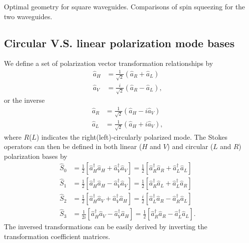 \documentclass[aps,pra,twocolumn,superscriptaddress]{revtex4-1} %
\newcommand{\comment}[1]{{\color{Maroon} #1}}
\begin{document}
\comment{Optimal geometry for square waveguides. Comparisons of spin squeezing for the two waveguides.}



\begin{appendix}
\section{Circular V.S. linear polarization mode bases}\label{Appendix:LRbases}
We define a set of polarization vector transformation relationships by 
\begin{subequations}
\begin{align}
\hat{a}_H &= \frac{1}{\sqrt{2}}(\hat{a}_R+\hat{a}_L )\\
\hat{a}_V &= \frac{i}{\sqrt{2}}(\hat{a}_R-\hat{a}_L ),
\end{align}
\end{subequations}
or the inverse
\begin{subequations}
\begin{align}
\hat{a}_R &= \frac{1}{\sqrt{2}}(\hat{a}_H-i\hat{a}_V )\\
\hat{a}_L &= \frac{1}{\sqrt{2}}(\hat{a}_H+i\hat{a}_V ),
\end{align}
\end{subequations}
where $ R $($ L $) indicates the right(left)-circularly polarized mode.
The Stokes operators can then be defined in both linear ($ H $ and $ V $) and circular ($ L $ and $ R $) polarization bases by
\begin{subequations}
\begin{align}
\hat{S}_0 &= \frac{1}{2} \left[\hat{a}_H^\dagger\hat{a}_H+\hat{a}_V^\dagger\hat{a}_V \right] = \frac{1}{2} \left[\hat{a}_R^\dagger\hat{a}_R+\hat{a}_L^\dagger\hat{a}_L \right]\\
\hat{S}_1 &= \frac{1}{2} \left[\hat{a}_H^\dagger\hat{a}_H-\hat{a}_V^\dagger\hat{a}_V \right] = \frac{1}{2} \left[\hat{a}_R^\dagger\hat{a}_L+\hat{a}_L^\dagger\hat{a}_R \right]\\
\hat{S}_2 &= \frac{1}{2} \left[\hat{a}_H^\dagger\hat{a}_V+\hat{a}_V^\dagger\hat{a}_H \right] = \frac{i}{2} \left[\hat{a}_L^\dagger\hat{a}_R-\hat{a}_R^\dagger\hat{a}_L \right]\\
\hat{S}_3 &= \frac{1}{2i} \left[\hat{a}_H^\dagger\hat{a}_V-\hat{a}_V^\dagger\hat{a}_H \right] = \frac{1}{2} \left[\hat{a}_R^\dagger\hat{a}_R-\hat{a}_L^\dagger\hat{a}_L \right].
\end{align}
\end{subequations}
The inversed transformations can be easily derived by inverting the transformation coefficient matrices. 


\end{appendix}
\end{document}
